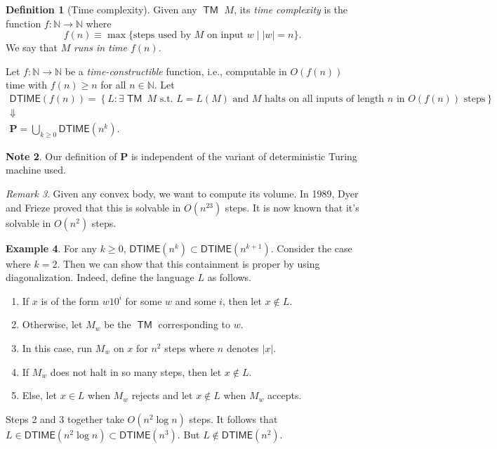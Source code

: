 \documentclass[10pt,letterpaper,cm]{nupset}
\theoremstyle{definition}
\newtheorem{definition}{Definition}[subsection]
\newtheorem{exmp}[definition]{Example}
\newtheorem{note}[definition]{Note}
\theoremstyle{theorem}
\theoremstyle{remark}
\newtheorem{remark}[definition]{Remark}
\newcommand{\N}{\mathbb N}
\newcommand{\1}{\mathbf{1}}
\newcommand{\0}{\vec 0}
\DeclareMathOperator{\TM}{\mathsf{TM}}
\begin{document}
\smallskip

\begin{definition}[Time complexity]
Given any $\TM$ $M$, its \textit{time complexity} is the function $f: \N \to \N$ where $$f(n) \equiv\max\{\text{steps used by }M \text{ on input }w\mid \left\lvert{w}\right\rvert =n\}.$$ We say that $M$ \textit{runs in time $f(n)$}.
\end{definition}

\smallskip

Let $f: \N \to \N$ be a \textit{time-constructible} function, i.e., computable in $O(f(n))$ time with $f(n)\geq n$ for all $n\in \N$. Let 
\begin{gather*}
\mathsf{DTIME}(f(n))  = \left\{ L : \exists \TM \ M  \text{ s.t. } L = L(M) \text{ and }M \text{ halts on all inputs of length }n \text{ in }O(f(n)) \text{ steps}\right\}
\\  \Downarrow
\\
 \mathbf{P}  = \bigcup_{k\geq 0} \mathsf{DTIME}\left(n^k\right)
.
\end{gather*}


\begin{note}
Our definition of $\mathbf{P}$ is independent of the variant of deterministic Turing machine used. 
\end{note}

\begin{remark}
Given any convex body, we want to compute its volume. In 1989, Dyer and Frieze proved that this is solvable in $O(n^{23})$ steps. It is now known that it's solvable in $O(n^2)$ steps. 
\end{remark}

\begin{exmp}
For any $k\geq 0$, $\mathsf{DTIME}(n^k) \subset \mathsf{DTIME}(n^{k+1})$. Consider the case where $k=2$. Then we can show that this containment  is proper by using diagonalization. Indeed, define the language $L$ as follows. 
\begin{enumerate}
\item If $x$ is of the form $w10^i$ for some $w$ and some $i$, then let $x\notin L$.
\item Otherwise, let $M_w$ be the $\TM$ corresponding to $w$. 
\item In this case, run $M_w$ on $x$ for $n^2$ steps where $n$ denotes $\left\lvert{x}\right\rvert$. 
\item  If $M_w$ does not halt in so many steps, then let $x\notin L$. 
\item Else, let $x\in L$ when $M_w$ rejects and let $x\notin L$ when $M_w$ accepts. 
\end{enumerate}
Steps 2 and 3 together take $O(n^2 \log{n})$ steps. It follows that $L \in \mathsf{DTIME}(n^2\log{n})\subset \mathsf{DTIME}(n^3)$. But $L \notin \mathsf{DTIME}(n^2)$.
\end{exmp}
\end{document}
